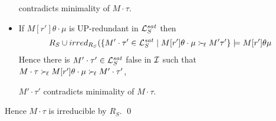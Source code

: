 \documentclass[%
handout,
]{beamer}
\begin{document}
\begin{frame}[allowframebreaks]
\begin{itemize}
            contradicts minimality of $M\cdot\tau$.


            \vspace{0.7em}
            \item If $M[r']\theta\cdot\mu$ is UP-redundant in $\mathcal{L}_S^{sat}$ then
            \begin{gather*}
                R_S \cup irred_{R_S}(
                \{
                    M'\cdot\tau'\in\mathcal{L}_S^{sat}\mid
                    M[r']\theta\cdot\mu \mathrel\succ_{\!\ell} M'\tau'
                    \} \models M[r']\theta\mu
            \end{gather*}
            Hence there is $M'\cdot\tau'\in\mathcal{L}_S^{sat}$ false in $\mathcal{I}$ such that
            $M\cdot\tau\mathrel\succ_{\!\ell} M[r']\theta\cdot\mu\mathrel\succ_{\!\ell} M'\cdot\tau'$,

            $M'\cdot\tau'$ contradicts minimality of $M\cdot\tau$.

        \end{itemize}

        Hence $M\cdot\tau$ is irreducible by $R_S$.
        \hfill\qed

\end{frame}
\end{document}
